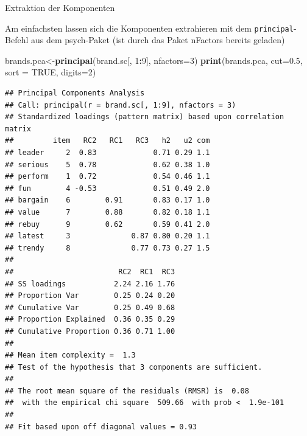\documentclass[12pt,ngerman,a4paper,ignorenonframetext,]{beamer}
\newenvironment{Shaded}{\begin{snugshade}}{\end{snugshade}}
\newcommand{\DataTypeTok}[1]{\textcolor[rgb]{0.13,0.29,0.53}{#1}}
\newcommand{\DecValTok}[1]{\textcolor[rgb]{0.00,0.00,0.81}{#1}}
\newcommand{\FloatTok}[1]{\textcolor[rgb]{0.00,0.00,0.81}{#1}}
\newcommand{\KeywordTok}[1]{\textcolor[rgb]{0.13,0.29,0.53}{\textbf{#1}}}
\newcommand{\NormalTok}[1]{#1}
\newcommand{\OperatorTok}[1]{\textcolor[rgb]{0.81,0.36,0.00}{\textbf{#1}}}
\newcommand{\OtherTok}[1]{\textcolor[rgb]{0.56,0.35,0.01}{#1}}
\begin{document}
\begin{frame}{Extraktion der Komponenten}
\protect\hypertarget{extraktion-der-komponenten}{}

Am einfachsten lassen sich die Komponenten extrahieren mit dem
\texttt{principal}-Befehl aus dem psych-Paket (ist durch das Paket
nFactors bereits geladen)

\begin{Shaded}
\begin{Highlighting}[]
\NormalTok{brands.pca<-}\KeywordTok{principal}\NormalTok{(brand.sc[, }\DecValTok{1}\OperatorTok{:}\DecValTok{9}\NormalTok{], }\DataTypeTok{nfactors=}\DecValTok{3}\NormalTok{)}
\KeywordTok{print}\NormalTok{(brands.pca, }\DataTypeTok{cut=}\FloatTok{0.5}\NormalTok{, }\DataTypeTok{sort =} \OtherTok{TRUE}\NormalTok{, }\DataTypeTok{digits=}\DecValTok{2}\NormalTok{)}
\end{Highlighting}
\end{Shaded}

\begin{verbatim}
## Principal Components Analysis
## Call: principal(r = brand.sc[, 1:9], nfactors = 3)
## Standardized loadings (pattern matrix) based upon correlation matrix
##         item   RC2   RC1   RC3   h2   u2 com
## leader     2  0.83             0.71 0.29 1.1
## serious    5  0.78             0.62 0.38 1.0
## perform    1  0.72             0.54 0.46 1.1
## fun        4 -0.53             0.51 0.49 2.0
## bargain    6        0.91       0.83 0.17 1.0
## value      7        0.88       0.82 0.18 1.1
## rebuy      9        0.62       0.59 0.41 2.0
## latest     3              0.87 0.80 0.20 1.1
## trendy     8              0.77 0.73 0.27 1.5
## 
##                        RC2  RC1  RC3
## SS loadings           2.24 2.16 1.76
## Proportion Var        0.25 0.24 0.20
## Cumulative Var        0.25 0.49 0.68
## Proportion Explained  0.36 0.35 0.29
## Cumulative Proportion 0.36 0.71 1.00
## 
## Mean item complexity =  1.3
## Test of the hypothesis that 3 components are sufficient.
## 
## The root mean square of the residuals (RMSR) is  0.08 
##  with the empirical chi square  509.66  with prob <  1.9e-101 
## 
## Fit based upon off diagonal values = 0.93
\end{verbatim}

\end{frame}
\end{document}
